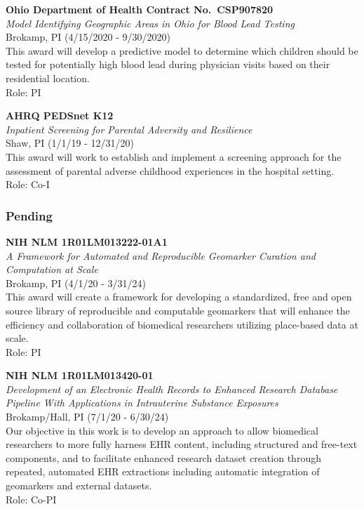 \textbf{Ohio Department of Health Contract No.~CSP907820}\\
\emph{Model Identifying Geographic Areas in Ohio for Blood Lead
Testing}\\
Brokamp, PI (4/15/2020 - 9/30/2020)\\
This award will develop a predictive model to determine which children
should be tested for potentially high blood lead during physician visits
based on their residential location.\\
Role: PI

\textbf{AHRQ PEDSnet K12}\\
\emph{Inpatient Screening for Parental Adversity and Resilience}\\
Shaw, PI (1/1/19 - 12/31/20)\\
This award will work to establish and implement a screening approach for
the assessment of parental adverse childhood experiences in the hospital
setting.\\
Role: Co-I

\hypertarget{pending}{%
\subsubsection{Pending}\label{pending}}

\textbf{NIH NLM 1R01LM013222-01A1}\\
\emph{A Framework for Automated and Reproducible Geomarker Curation and
Computation at Scale}\\
Brokamp, PI (4/1/20 - 3/31/24)\\
This award will create a framework for developing a standardized, free
and open source library of reproducible and computable geomarkers that
will enhance the efficiency and collaboration of biomedical researchers
utilizing place-based data at scale.\\
Role: PI

\textbf{NIH NLM 1R01LM013420-01}\\
\emph{Development of an Electronic Health Records to Enhanced Research
Database Pipeline With Applications in Intrauterine Substance
Exposures}\\
Brokamp/Hall, PI (7/1/20 - 6/30/24)\\
Our objective in this work is to develop an approach to allow biomedical
researchers to more fully harness EHR content, including structured and
free-text components, and to facilitate enhanced research dataset
creation through repeated, automated EHR extractions including automatic
integration of geomarkers and external datasets.\\
Role: Co-PI

